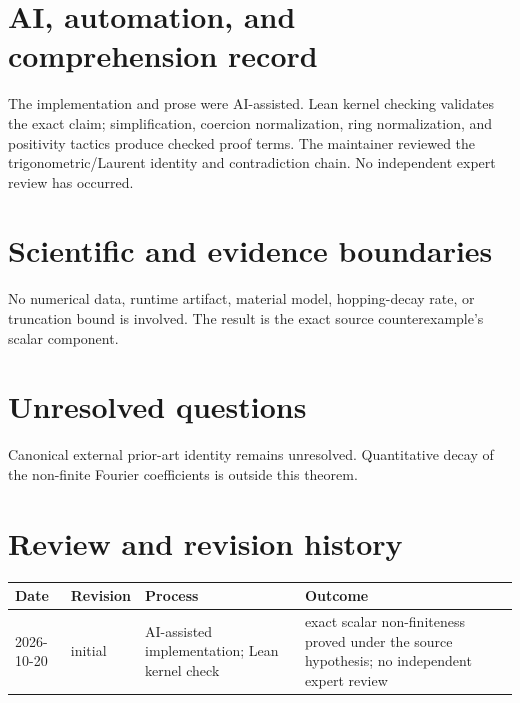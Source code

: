 \documentclass[11pt]{article}
\begin{document}
\section{AI, automation, and comprehension record}
The implementation and prose were AI-assisted. Lean kernel checking validates the exact
claim; simplification, coercion normalization, ring normalization, and positivity tactics
produce checked proof terms. The maintainer reviewed the trigonometric/Laurent identity
and contradiction chain. No independent expert review has occurred.

\section{Scientific and evidence boundaries}
No numerical data, runtime artifact, material model, hopping-decay rate, or truncation
bound is involved. The result is the exact source counterexample's scalar component.

\section{Unresolved questions}
Canonical external prior-art identity remains unresolved. Quantitative decay of the
non-finite Fourier coefficients is outside this theorem.

\section{Review and revision history}
\begin{tabularx}{\textwidth}{@{}lllX@{}}\toprule
Date & Revision & Process & Outcome \\
\midrule
2026-10-20 & initial & AI-assisted implementation; Lean kernel check & exact scalar non-finiteness proved under the source hypothesis; no independent expert review \\
\bottomrule\end{tabularx}
\end{document}
